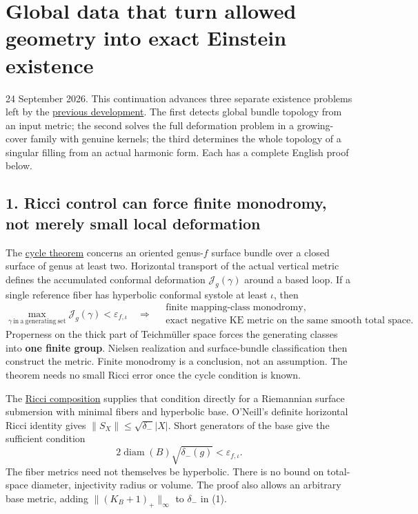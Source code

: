\documentclass[
  11pt,
]{article}
\author{}
\date{}
\begin{document}
\hypertarget{global-data-that-turn-allowed-geometry-into-exact-einstein-existence}{%
\section{Global data that turn allowed geometry into exact Einstein
existence}\label{global-data-that-turn-allowed-geometry-into-exact-einstein-existence}}

24 September 2026. This continuation advances three separate existence
problems left by the \href{20260924_frontier_bridges.md}{previous
development}. The first detects global bundle topology from an input
metric; the second solves the full deformation problem in a
growing-cover family with genuine kernels; the third determines the
whole topology of a singular filling from an actual harmonic form. Each
has a complete English proof below.

\hypertarget{ricci-control-can-force-finite-monodromy-not-merely-small-local-deformation}{%
\subsection{1. Ricci control can force finite monodromy, not merely
small local
deformation}\label{ricci-control-can-force-finite-monodromy-not-merely-small-local-deformation}}

The \href{20260924_cycle_holonomy_realization.md}{cycle theorem}
concerns an oriented genus-\(f\) surface bundle over a closed surface of
genus at least two. Horizontal transport of the actual vertical metric
defines the accumulated conformal deformation \(\mathcal J_g(\gamma)\)
around a based loop. If a single reference fiber has hyperbolic
conformal systole at least \(\iota\), then \[
 \max_{\gamma\ \mathrm{in\ a\ generating\ set}}
       \mathcal J_g(\gamma)<\varepsilon_{f,\iota}
 \quad\Longrightarrow\quad
 \begin{gathered}
 \text{finite mapping-class monodromy},\\
 \text{exact negative KE metric on the same smooth total space}.
 \end{gathered}
\] Properness on the thick part of Teichmüller space forces the
generating classes into \textbf{one finite group}. Nielsen realization
and surface-bundle classification then construct the metric. Finite
monodromy is a conclusion, not an assumption. The theorem needs no small
Ricci error once the cycle condition is known.

The \href{20260924_ricci_monodromy_realization.md}{Ricci composition}
supplies that condition directly for a Riemannian surface submersion
with minimal fibers and hyperbolic base. O'Neill's definite horizontal
Ricci identity gives \(\|S_X\|\le\sqrt{\delta_-}|X|\). Short generators
of the base give the sufficient condition \[
        2\operatorname{diam}(B)\sqrt{\delta_-(g)}
                       <\varepsilon_{f,\iota}.              \tag{1}
\] The fiber metrics need not themselves be hyperbolic. There is no
bound on total-space diameter, injectivity radius or volume. The proof
also allows an arbitrary base metric, adding \(\|(K_B+1)_+\|_\infty\) to
\(\delta_-\) in (1).
\end{document}

